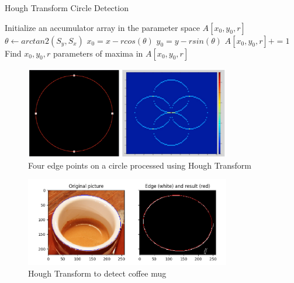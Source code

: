 \documentclass{article}
\begin{document}
\begin{algorithm}
\caption{Hough Transform Circle Detection}
\label{circalgo}
\begin{algorithmic}
        \State Initialize an accumulator array in the parameter space $A[x_0,y_0,r]$
                \State $\theta \gets arctan2(S_y, S_x)$
                \State $x_0 = x-rcos(\theta)$
                \State $y_0 = y-rsin(\theta)$
                \State $A[x_0,y_0,r] += 1$
            \EndFor
        \EndFor
        \State Find $x_0,y_0,r$ parameters of maxima in $A[x_0,y_0,r]$
        \\
\EndFunction
\end{algorithmic}
\end{algorithm}

\begin{figure}[!h]
    \centering
    \vspace{-10pt}
    \includegraphics[width=0.8\textwidth]{circle.jpg}
    \caption{Four edge points on a circle processed using Hough Transform}
    \label{fig:diagram}
\end{figure}

\begin{figure}[!h]
    \centering
    \vspace{-10pt}
    \hspace{-30pt}
    \includegraphics[width=0.8\textwidth]{coffe.png}
    \caption{Hough Transform to detect coffee mug}
    \label{fig:diagram}
\end{figure}
\end{document}
